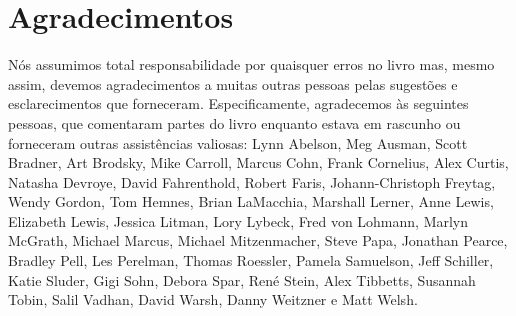 \chapter{Agradecimentos}
\label{agrad}


Nós assumimos total responsabilidade por quaisquer erros no livro mas, mesmo
assim, devemos agradecimentos a muitas outras pessoas pelas sugestões e
esclarecimentos que forneceram. Especificamente, agradecemos às seguintes
pessoas, que comentaram partes do livro enquanto estava em rascunho ou
forneceram outras assistências valiosas: Lynn Abelson, Meg Ausman, Scott
Bradner, Art Brodsky, Mike Carroll, Marcus Cohn, Frank Cornelius, Alex Curtis,
Natasha Devroye, David Fahrenthold, Robert Faris, Johann-Christoph Freytag,
Wendy Gordon, Tom Hemnes, Brian LaMacchia, Marshall Lerner, Anne Lewis,
Elizabeth Lewis, Jessica Litman, Lory Lybeck, Fred von Lohmann, Marlyn McGrath,
Michael Marcus, Michael Mitzenmacher, Steve Papa, Jonathan Pearce, Bradley Pell,
Les Perelman, Thomas Roessler, Pamela Samuelson, Jeff Schiller, Katie Sluder,
Gigi Sohn, Debora Spar, René Stein, Alex Tibbetts, Susannah Tobin, Salil Vadhan,
David Warsh, Danny Weitzner e Matt Welsh.

